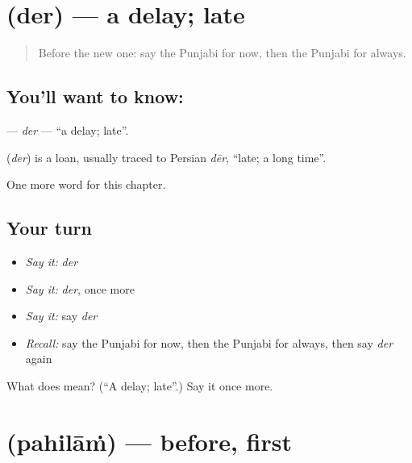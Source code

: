 \section[\texorpdfstring{\pa{ਦੇਰ} (der)}{ਦੇਰ (der)}]{ (der) — a delay; late}

\label{lesson:PA-C87-der}



\begin{quote}
Before the new one: say the Punjabi for now, then the Punjabi for always.
\end{quote}

\subsection*{You'll want to know: }
\textbf{} — \emph{der} — \textquotedblleft{}a delay; late\textquotedblright{}.

\begin{cousinweb}
\textbf{} (\emph{der}) is a loan, usually traced to Persian \emph{dēr}, \textquotedblleft{}late; a long time\textquotedblright{}.
\end{cousinweb}

\begin{grammarlens}[title={What you've built}]
One more word for this chapter.
\end{grammarlens}

\subsection*{Your turn}
\begin{itemize}
\raggedright
  \item \emph{Say it:} \emph{der}
  \item \emph{Say it:} \emph{der}, once more
  \item \emph{Say it:} say \emph{der}
  \item \emph{Recall:} say the Punjabi for now, then the Punjabi for always, then say \emph{der} again
\end{itemize}

\begin{tcolorbox}[breakable,colback=teal!4,colframe=teal!35!black,title={Before you move on}]
What does  mean? (\textquotedblleft{}A delay; late\textquotedblright{}.) Say it once more.
\end{tcolorbox}
\section[\texorpdfstring{\pa{ਪਹਿਲਾਂ} (pahilāṁ)}{ਪਹਿਲਾਂ (pahilāṁ)}]{ (pahilāṁ) — before, first}

